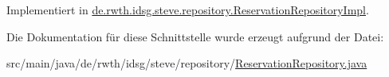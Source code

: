 Implementiert in \hyperlink{classde_1_1rwth_1_1idsg_1_1steve_1_1repository_1_1_reservation_repository_impl_a3b53b88501f1d4072453d54e3544171f}{de.\-rwth.\-idsg.\-steve.\-repository.\-Reservation\-Repository\-Impl}.



Die Dokumentation für diese Schnittstelle wurde erzeugt aufgrund der Datei\-:\begin{DoxyCompactItemize}
\item 
src/main/java/de/rwth/idsg/steve/repository/\hyperlink{_reservation_repository_8java}{Reservation\-Repository.\-java}\end{DoxyCompactItemize}
